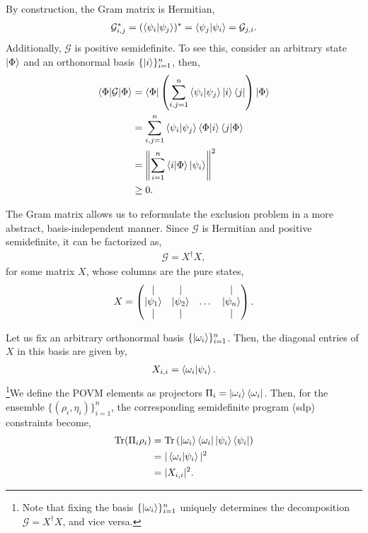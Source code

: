 \documentclass[12pt,letterpaper]{article}
\DeclareMathOperator{\tr}{Tr}
\begin{document}
\begin{multicols}{2}
By construction, the Gram matrix is Hermitian,
\begin{align*}
	\mathcal{G}_{i,j}^* = (\braket{\psi_i|\psi_j})^* = \braket{\psi_j|\psi_i} = \mathcal{G}_{j,i}.
\end{align*}
Additionally, $\mathcal{G}$ is positive semidefinite. To see this, consider an arbitrary state $\ket{\Phi}$ and an orthonormal basis $\{\ket{i}\}_{i=1}^n$, then,
\begin{align*}
	\braket{\Phi|\mathcal{G}|\Phi} &= \braket{\Phi| \left( \sum_{i,j=1}^{n} \braket{\psi_i|\psi_j} \ket{i}\bra{j} \right) |\Phi} \\
	&= \sum_{i,j=1}^{n} \braket{\psi_i|\psi_j} \braket{\Phi|i} \braket{j|\Phi} \\
	&= \left\| \sum_{i=1}^{n} \braket{i|\Phi} \ket{\psi_i} \right\|^2 \\
	&\geq 0.
\end{align*}

The Gram matrix allows us to reformulate the exclusion problem in a more abstract, basis-independent manner. Since $\mathcal{G}$ is Hermitian and positive semidefinite, it can be factorized as,
\begin{align*}
	\mathcal{G} = X^\dagger X,
\end{align*}
for some matrix $X$, whose columns are the pure states,
\begin{align*}
	X = \begin{pmatrix}
		\mid & \mid &        & \mid \\
		\ket{\psi_1} & \ket{\psi_2} & \dots & \ket{\psi_n} \\
		\mid & \mid &        & \mid
	\end{pmatrix}.
\end{align*}

Let us fix an arbitrary orthonormal basis $\{\ket{\omega_i}\}_{i=1}^n$. Then, the diagonal entries of $X$ in this basis are given by,
\begin{align*}
	X_{i,i} = \braket{\omega_i|\psi_i}.
\end{align*}
\footnote{Note that fixing the basis $\{\ket{\omega_i}\}_{i=1}^n$ uniquely determines the decomposition $\mathcal{G} = X^\dagger X$, and vice versa.}We define the POVM elements as projectors $\Pi_i = \ket{\omega_i}\bra{\omega_i}$. Then, for the ensemble $\{(\rho_i, \eta_i)\}_{i=1}^n$, the corresponding semidefinite program (\gls{sdp}) constraints become,
\begin{align*}
	\tr(\Pi_i \rho_i) &= \tr\left( \ket{\omega_i}\bra{\omega_i} \ket{\psi_i}\bra{\psi_i} \right) \\
	&= |\braket{\omega_i|\psi_i}|^2 \\
	&= |X_{i,i}|^2.
\end{align*}


\end{multicols}
\end{document}
